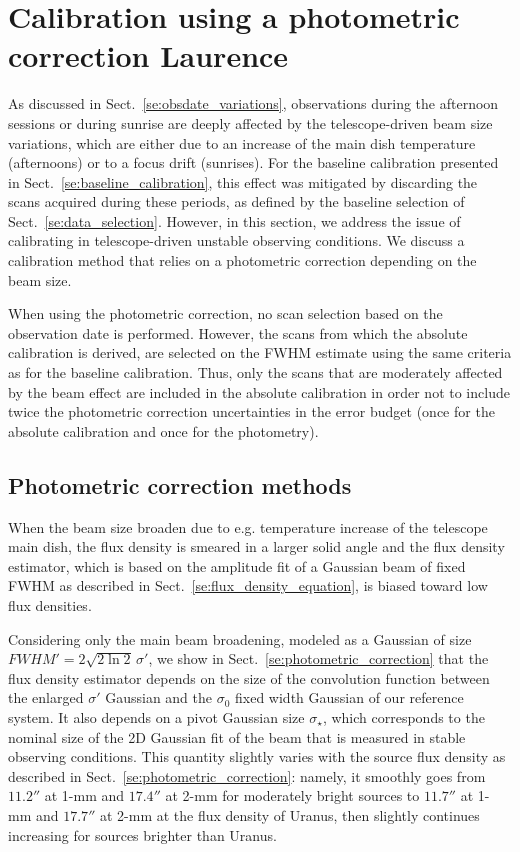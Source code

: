 \section{Calibration using a photometric correction {\color{blue} Laurence} }
\label{se:photocorr_calibration}

As discussed in Sect.~\ref{se:obsdate_variations}, observations during the
afternoon sessions or
during sunrise
are deeply affected by the telescope-driven beam
size variations, which are either due to an increase of the main dish
temperature (afternoons) or to a focus drift (sunrises).
For the baseline calibration presented in
Sect.~\ref{se:baseline_calibration}, this effect was mitigated by
discarding the scans acquired during these periods, as defined by the
baseline selection of Sect.~\ref{se:data_selection}. However, in
this section, we address the issue of calibrating in
telescope-driven unstable observing conditions. We discuss a
calibration method that relies on a photometric correction
depending on the beam size. 

When using the photometric correction, no scan selection based on the
observation date is performed. However, the scans from which the
absolute calibration is derived, are selected on the FWHM estimate
using the same criteria as for the baseline calibration. Thus, only
the scans that are moderately affected by the beam effect are included
in the absolute calibration in order not to include twice the
photometric correction uncertainties in the error budget (once for the
absolute calibration and once for the photometry).


\subsection{Photometric correction methods}
\label{se:photocorr_methods}

When the beam size broaden due to e.g. temperature increase of the
telescope main dish, the flux density is smeared in a larger solid angle and
the flux density estimator, which is based on the amplitude fit of a
Gaussian beam of fixed FWHM as described in
Sect.~\ref{se:flux_density_equation}, is biased toward low flux densities.

Considering only the main beam broadening, modeled as a Gaussian of
size $FWHM' = 2 \sqrt{2\ln{2}} \, \sigma '$, we show in
Sect.~\ref{se:photometric_correction} that
the flux density estimator depends on the size of the convolution
function between the enlarged $\sigma '$ Gaussian and the 
$\sigma_0$ fixed width Gaussian of our reference system. It also
depends on a pivot Gaussian size $\sigma_{\star}$, which corresponds
to the nominal size of the 2D Gaussian fit of the beam that is
measured in stable observing conditions. This quantity
slightly varies with the source flux density as described in
Sect.~\ref{se:photometric_correction}: namely, it smoothly goes from
$11.2''$ at 1-mm and $17.4''$ at 2-mm for moderately bright sources to
$11.7''$ at 1-mm and $17.7''$ at 2-mm at the flux density of Uranus,
then slightly continues increasing for sources brighter than Uranus.  

